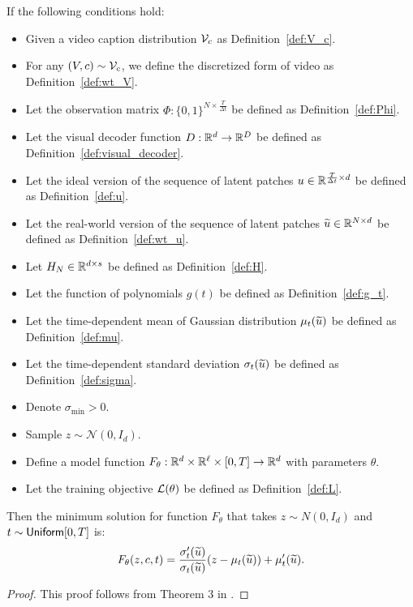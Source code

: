 \begin{theorem}\label{thm:close_form}
    If the following conditions hold:
    \begin{itemize}
        \item Given a video caption distribution ${\cal V}_c$ as Definition~\ref{def:V_c}.
        \item For any $(V, c) \sim {\cal V}_c$, we define the discretized form of video as Definition~\ref{def:wt_V}.
        \item Let the observation matrix $\Phi: \{0, 1\}^{N \times \frac{T}{\Delta t}}$ be defined as Definition~\ref{def:Phi}.
        \item Let the visual decoder function $D: \mathbb{R}^d \rightarrow \mathbb{R}^D$ be defined as Definition~\ref{def:visual_decoder}.
        \item Let the ideal version of the sequence of latent patches $u \in \mathbb{R}^{\frac{T}{\Delta t} \times d}$ be defined as Definition~\ref{def:u}.
        \item Let the real-world version of the sequence of latent patches $\widetilde{u} \in \mathbb{R}^{N \times d}$ be defined as Definition~\ref{def:wt_u}.
        \item Let $H_N \in \mathbb{R}^{d \times s}$ be defined as Definition~\ref{def:H}.
        \item Let the function of polynomials $g(t)$ be defined as Definition~\ref{def:g_t}.
        \item Let the time-dependent mean of Gaussian distribution $\mu_t(\widetilde{u})$ be defined as Definition~\ref{def:mu}.
        \item Let the time-dependent standard deviation $\sigma_t(\widetilde{u})$ be defined as Definition~\ref{def:sigma}.
        \item Denote $\sigma_{\min} > 0$.
        \item Sample $z \sim \mathcal{N}(0, I_d)$.
        \item Define a model function $F_\theta: \mathbb{R}^d \times \mathbb{R}^\ell \times [0, T] \rightarrow \mathbb{R}^d$ with parameters $\theta$.
        \item Let the training objective ${\cal L}(\theta)$ be defined as Definition~\ref{def:L}.
    \end{itemize}
    Then the minimum solution for function $F_\theta$ that takes $z \sim N(0, I_d)$ and $t \sim {\sf Uniform}[0, T]$ is:
    \begin{align*}
        F_\theta(z, c, t) = \frac{\sigma_t'(\widetilde{u})}{\sigma_t(\widetilde{u})} (z - \mu_t(\widetilde{u})) + \mu_t'(\widetilde{u}).
    \end{align*}
\end{theorem}

\begin{proof}
    This proof follows from Theorem 3 in \cite{lcb+22}.
\end{proof}